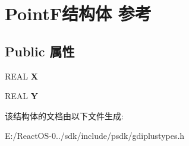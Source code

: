 \hypertarget{struct_point_f}{}\section{Point\+F结构体 参考}
\label{struct_point_f}
\subsection*{Public 属性}
\begin{DoxyCompactItemize}
\item 
\mbox{\label{struct_point_f_a866a5ebcc43c3b19634060f788060cc6}} 
R\+E\+AL {\bfseries X}
\item 
\mbox{\label{struct_point_f_a0a66f5f65c1727bbc3c0adae330d7bfd}} 
R\+E\+AL {\bfseries Y}
\end{DoxyCompactItemize}


该结构体的文档由以下文件生成\+:\begin{DoxyCompactItemize}
\item 
E\+:/\+React\+O\+S-\/0../sdk/include/psdk/gdiplustypes.\+h\end{DoxyCompactItemize}
